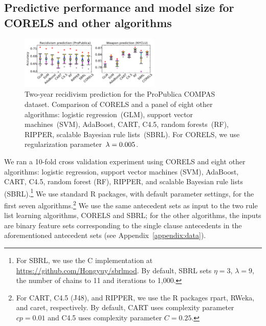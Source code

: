 \subsection{Predictive performance and model size for CORELS and other algorithms}
\label{sec:sparsity}

\begin{figure}[t!]
\begin{center}
\includegraphics[trim={2mm, 5mm, 102mm, 0mm}, clip,
width=0.6\textwidth]{figs/compare-compas-weapon.pdf}
\end{center}
\caption{Two-year recidivism prediction for the ProPublica COMPAS dataset.
%
Comparison of CORELS and a panel of eight other algorithms:
logistic regression~(GLM), support vector machines~(SVM),
AdaBoost, CART, C4.5, random forests~(RF), RIPPER,
scalable Bayesian rule lists~(SBRL).
%
For CORELS, we use regularization parameter~${{\lambda}=0.005}$.
}
\label{fig:compas-comparison}
\end{figure}

We ran a 10-fold cross validation experiment using CORELS
and eight other algorithms:
logistic regression, support vector machines (SVM), AdaBoost, CART, C4.5,
random forest (RF), RIPPER, and scalable Bayesian rule lists (SBRL).\footnote{For
SBRL, we use the C implementation at \url{https://github.com/Hongyuy/sbrlmod}.
By default, SBRL sets ${\eta = 3}$, ${\lambda = 9}$,
the number of chains to 11 and iterations to 1,000.}
%
We use standard R packages, with default parameter settings,
for the first seven algorithms.\footnote{For CART, C4.5 (J48), and RIPPER,
we use the R packages rpart, RWeka, and caret, respectively.
%
By default, CART uses complexity parameter ${cp = 0.01}$ and C4.5 uses complexity parameter ${C = 0.25}$.
}
%
We use the same antecedent sets as input to the two rule list learning algorithms, CORELS and SBRL;
for the other algorithms, the inputs are binary feature sets corresponding to the
single clause antecedents in the aforementioned antecedent sets (see Appendix~\ref{appendix:data}).

